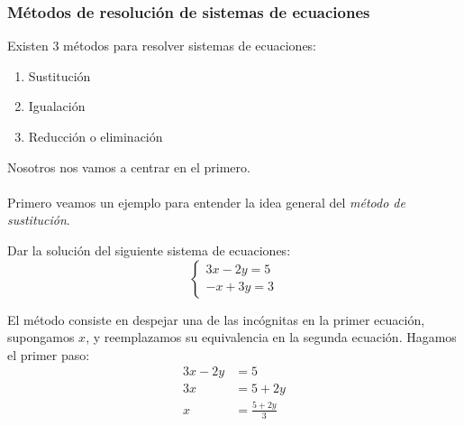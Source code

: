\documentclass{article}
\begin{document}
\subsubsection*{Métodos de resolución de sistemas de ecuaciones}
\begin{normalsize}
Existen 3 métodos para resolver sistemas de ecuaciones:
\begin{enumerate}
	\item Sustitución
	\item Igualación
	\item Reducción o eliminación
\end{enumerate}
Nosotros nos vamos a centrar en el primero.\\\\
Primero veamos un ejemplo para entender la idea general del \textit{método de sustitución}.

\begin{ejemplo}
Dar la solución del siguiente sistema de ecuaciones:
	\begin{equation}
		\begin{cases}
		3x-2y=5\nonumber\\
		-x+3y=3	
		\end{cases}
	\end{equation}

El método consiste en despejar una de las incógnitas en la primer ecuación, supongamos $x$, y reemplazamos su equivalencia en la segunda ecuación.
Hagamos el primer paso:
	\begin{align}
	3x-2y&=5\nonumber\\
	3x&=5+2y\nonumber\\
	x&=\frac{5+2y}{3}\nonumber
	\end{align}
\end{ejemplo}


\end{normalsize}
\end{document}
